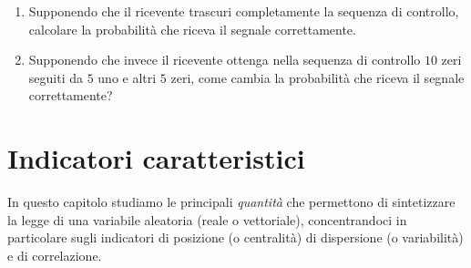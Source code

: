 \documentclass[
  italian,
  letterpaper,
]{book}
\theoremstyle{definition}
\theoremstyle{remark}
\begin{document}
\begin{enumerate}
\def\labelenumi{\arabic{enumi}.}
\item
  Supponendo che il ricevente trascuri completamente la sequenza di
  controllo, calcolare la probabilità che riceva il segnale
  correttamente.
\item
  Supponendo che invece il ricevente ottenga nella sequenza di controllo
  \(10\) zeri seguiti da \(5\) uno e altri \(5\) zeri, come cambia la
  probabilità che riceva il segnale correttamente?
\end{enumerate}


\chapter{Indicatori caratteristici}\label{indicatori-caratteristici}

In questo capitolo studiamo le principali \emph{quantità} che permettono
di sintetizzare la legge di una variabile aleatoria (reale o
vettoriale), concentrandoci in particolare sugli indicatori di posizione
(o centralità) di dispersione (o variabilità) e di correlazione.
\end{document}
